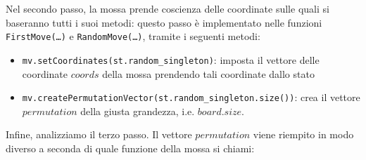     Nel secondo passo, la mossa prende coscienza delle coordinate sulle quali si baseranno tutti i suoi metodi: questo passo è implementato nelle funzioni \texttt{FirstMove(\dots)} e \texttt{RandomMove(\dots)}, tramite i seguenti metodi:
    \begin{itemize}
    	\item \texttt{mv.setCoordinates(st.random\_singleton)}: imposta il vettore delle coordinate $coords$ della mossa prendendo tali coordinate dallo stato
    	\item \texttt{mv.createPermutationVector(st.random\_singleton.size())}: crea il vettore $permutation$ della giusta grandezza, i.e. $board.size$.
    \end{itemize}

    Infine, analizziamo il terzo passo. Il vettore $permutation$ viene riempito in modo diverso a seconda di quale funzione della mossa si chiami:
